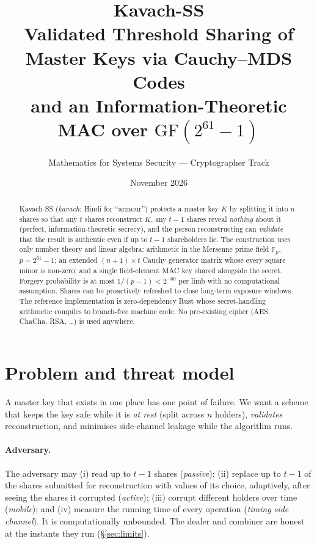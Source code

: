 \documentclass[11pt]{article}
\title{\textbf{Kavach-SS}\\[2pt]
\large Validated Threshold Sharing of Master Keys via Cauchy--MDS Codes\\
and an Information-Theoretic MAC over $\mathrm{GF}(2^{61}-1)$}
\author{Mathematics for Systems Security --- Cryptographer Track}
\date{November 2026}
\theoremstyle{remark}
\newcommand{\F}{\mathbb{F}_p}
\begin{document}
\maketitle

\begin{abstract}
\noindent
Kavach-SS (\emph{kavach}: Hindi for ``armour'') protects a master key $K$ by
splitting it into $n$ shares so that any $t$ shares reconstruct $K$, any $t-1$
shares reveal \emph{nothing} about it (perfect, information-theoretic secrecy),
and the person reconstructing can \emph{validate} that the result is authentic
even if up to $t-1$ shareholders lie. The construction uses only number theory
and linear algebra: arithmetic in the Mersenne prime field
$\F$, $p = 2^{61}-1$; an extended $(n+1)\times t$ Cauchy generator matrix whose
every square minor is non-zero; and a single field-element MAC key shared
alongside the secret. Forgery probability is at most $1/(p-1) < 2^{-60}$ per limb
with no computational assumption. Shares can be proactively refreshed to close
long-term exposure windows. The reference implementation is zero-dependency Rust
whose secret-handling arithmetic compiles to branch-free machine code.
No pre-existing cipher (AES, ChaCha, RSA, \ldots) is used anywhere.
\end{abstract}

\section{Problem and threat model}

A master key that exists in one place has one point of failure. We want a scheme
that keeps the key safe while it is \emph{at rest} (split across $n$ holders),
\emph{validates} reconstruction, and minimises side-channel leakage while the
algorithm runs.

\paragraph{Adversary.} The adversary may (i) read up to $t-1$ shares
(\emph{passive}); (ii) replace up to $t-1$ of the shares submitted for
reconstruction with values of its choice, adaptively, after seeing the shares it
corrupted (\emph{active}); (iii) corrupt different holders over time
(\emph{mobile}); and (iv) measure the running time of every operation
(\emph{timing side channel}). It is computationally unbounded. The dealer and
combiner are honest at the instants they run (\S\ref{sec:limits}).
\end{document}
